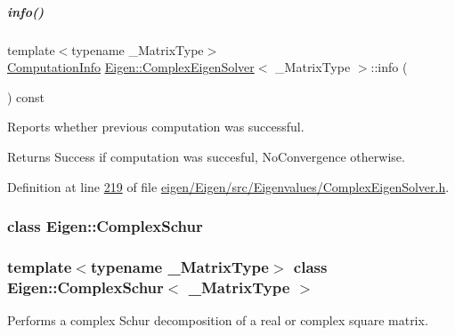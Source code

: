 \mbox{\label{group___eigenvalues___module_ad4d9d8b90145900b9686d2dabbe46730}} 
\subparagraph{\texorpdfstring{info()}{info()}\hspace{0.1cm}{\footnotesize\ttfamily [2/2]}}
{\footnotesize\ttfamily template$<$typename \+\_\+\+Matrix\+Type$>$ \\
\hyperlink{group__enums_ga85fad7b87587764e5cf6b513a9e0ee5e}{Computation\+Info} \hyperlink{group___eigenvalues___module_class_eigen_1_1_complex_eigen_solver}{Eigen\+::\+Complex\+Eigen\+Solver}$<$ \+\_\+\+Matrix\+Type $>$\+::info (\begin{DoxyParamCaption}{ }\end{DoxyParamCaption}) const\hspace{0.3cm}{\ttfamily [inline]}}



Reports whether previous computation was successful. 

\begin{DoxyReturn}{Returns}
{\ttfamily Success} if computation was succesful, {\ttfamily No\+Convergence} otherwise. 
\end{DoxyReturn}


Definition at line \hyperlink{eigen_2_eigen_2src_2_eigenvalues_2_complex_eigen_solver_8h_source_l00219}{219} of file \hyperlink{eigen_2_eigen_2src_2_eigenvalues_2_complex_eigen_solver_8h_source}{eigen/\+Eigen/src/\+Eigenvalues/\+Complex\+Eigen\+Solver.\+h}.

\label{class_eigen_1_1_complex_schur}
\subsubsection{class Eigen\+:\+:Complex\+Schur}
\subsubsection*{template$<$typename \+\_\+\+Matrix\+Type$>$\newline
class Eigen\+::\+Complex\+Schur$<$ \+\_\+\+Matrix\+Type $>$}

Performs a complex Schur decomposition of a real or complex square matrix. 


